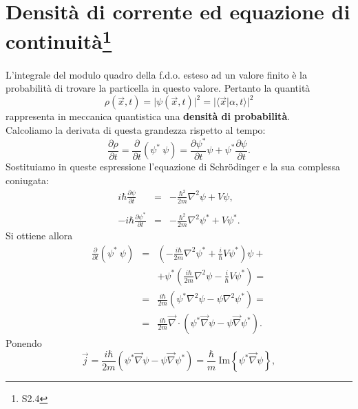 \documentclass[a4paper,12pt,oneside]{book}
\begin{document}
\section[Densità di corrente ed equazione di continuità]{Densità di corrente ed equazione di continuità\footnote{S2.4}}
L'integrale del modulo quadro della f.d.o. esteso ad un valore finito è la probabilità di trovare la particella in questo valore. Pertanto la quantità
\begin{equation}
\rho (\vec{x}, t) = \vert \psi (\vec{x},t) \vert ^2 = \vert \langle \vec{x}\vert \alpha, t \rangle \vert ^2
\end{equation}
rappresenta in meccanica quantistica una \textbf{densità di probabilità}.\\
Calcoliamo la derivata di questa grandezza rispetto al tempo:
\begin{equation}
\frac{\partial \rho}{\partial t} = \frac{\partial }{\partial t}\left( \psi^*\ \psi \right) = \frac{\partial \psi ^*}{\partial t}\psi + \psi^*\frac{\partial \psi}{\partial t}.
\end{equation}
Sostituiamo in queste espressione l'equazione di Schr\"{o}dinger e la sua complessa coniugata:
\begin{eqnarray}
 i\hbar \frac{\partial \psi}{\partial t} &=& -\frac{\hbar ^2}{2m} \nabla ^ 2 \psi + V \psi ,\nonumber \\
\\
 -i\hbar \frac{\partial \psi ^*}{\partial t} &=& -\frac{\hbar ^2}{2m} \nabla ^ 2 \psi ^* + V \psi ^* .\nonumber
\end{eqnarray}
Si ottiene allora
\begin{eqnarray}
\frac{\partial }{\partial t}\left(\psi^*\ \psi \right) & = & \left(-\frac{i\hbar}{2m}\nabla ^2 \psi ^* +\frac{i}{\hbar}V\psi ^*\right)\psi + \nonumber \\
& &+\psi ^* \left(\frac{i\hbar}{2m}\nabla ^2 \psi -\frac{i}{\hbar}V\psi ^*\right)=\\
&=& \frac{i\hbar}{2m}\left(\psi ^* \nabla ^2 \psi - \psi \nabla ^2 \psi ^* \right) = \nonumber \\
&=& \frac{i\hbar}{2m} \vec{\nabla}\cdot \left(\psi ^* \vec{\nabla} \psi - \psi \vec{\nabla} \psi ^* \right). \nonumber
\end{eqnarray}
Ponendo
\begin{equation}
\vec{j}=\frac{i\hbar}{2m} \left(\psi ^* \vec{\nabla} \psi - \psi \vec{\nabla} \psi ^* \right)= \frac{\hbar}{m}\ \textrm{Im}\left\{\psi ^* \vec{\nabla}\psi \right\},
\end{equation}
\end{document}
